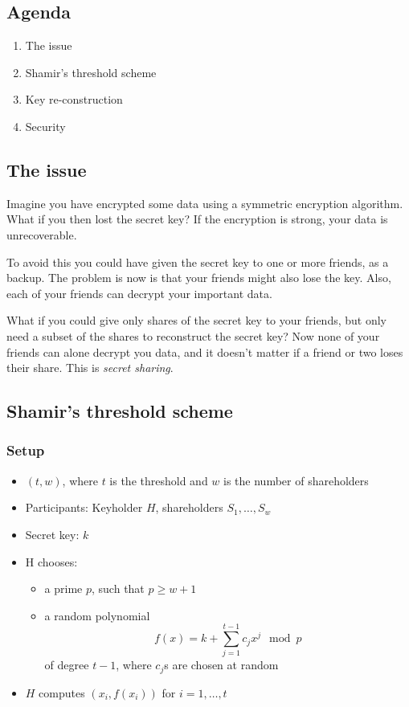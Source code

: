 

\subsection*{Agenda}
\begin{enumerate}
\item The issue
\item Shamir's threshold scheme
\item Key re-construction
\item Security
\end{enumerate}

\subsection{The issue}
Imagine you have encrypted some data using a
symmetric encryption algorithm. What if you then lost the secret key?
If the encryption is strong, your data is unrecoverable.

To avoid this you could have given the secret key to one or more
friends, as a backup. The problem is now is that your friends might
also lose the key. Also, each of your friends can decrypt your
important data.

What if you could give  only shares of the secret key to your
friends, but only need a subset of the shares to reconstruct the
secret key? Now none of your friends can alone decrypt you data, and
it doesn't matter if a friend or two loses their share. This is
\emph{secret sharing}.

\subsection{Shamir's threshold scheme}
\subsubsection*{Setup}
\begin{itemize}
\item $(t, w)$, where $t$ is the threshold and $w$ is the number of shareholders
\item Participants: Keyholder $H$, shareholders $S_1, \ldots, S_w$
\item Secret key: $k$
\item H chooses:
  \begin{itemize}
  \item a prime $p$, such that $p \ge w + 1$
  \item a random polynomial
    \[
    f(x) = k + \sum\limits_{j=1}^{t-1} c_jx^j \mod p
    \]
    of degree $t-1$, where $c_j$s are chosen at random
  \end{itemize}
\item $H$ computes $(x_i, f(x_i))$ for $i  = 1, \ldots, t$
\end{itemize}

